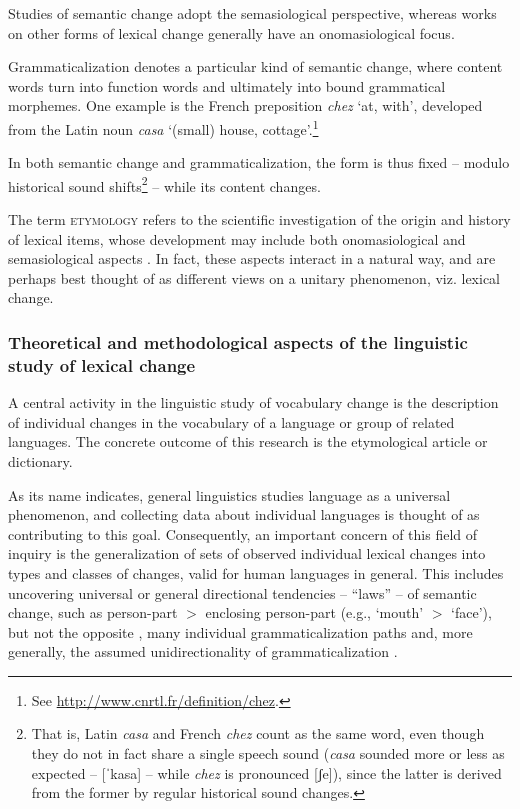 \documentclass[output=paper]{langsci/langscibook}
\begin{document}
\begin{sloppypar}
Studies of semantic change adopt the semasiological perspective, whereas works on other forms of lexical change generally have an onomasiological focus.
\end{sloppypar}

Grammaticalization
\citep{hopper-traugott-1993,heine-kuteva,smith-2011} denotes a
particular kind of semantic change, where content words turn into
function words and ultimately into bound grammatical morphemes. One example is the
French preposition \emph{chez} `at, with', developed from the Latin
noun \emph{casa} `(small) house, cottage'.\footnote{See
  \url{http://www.cnrtl.fr/definition/chez}.}

In both semantic change and grammaticalization, the form is thus fixed
-- modulo historical sound shifts\footnote{That is, Latin \emph{casa}
  and French \emph{chez} count as the same word, even though they do
  not in fact share a single speech sound (\emph{casa} sounded more or
  less as expected -- 
  [ˈkasa] 
-- while \emph{chez} is pronounced 
  [ʃe]), 
  since the
  latter is derived from the former by regular historical sound
  changes.} -- while its content changes.

The term \textsc{etymology} refers to the scientific investigation of the origin and history of
lexical items, whose development may include both onomasiological and
semasiological aspects \citep{malkiel,anttila-1972,mailhammer-2015}. In fact, these
aspects interact in a natural way, and are perhaps best thought of as
different views on a unitary phenomenon, viz. lexical change. 

\subsubsection{Theoretical and methodological aspects of the linguistic study of lexical change} 

A central activity in the linguistic study of vocabulary change is the description of individual
changes in the vocabulary of a language or group of related
languages. The concrete outcome of this research is the etymological
article or dictionary.

As its name indicates, general linguistics studies language as a
universal phenomenon, and collecting data about individual languages
is thought of as contributing to this goal. Consequently, an important
concern of this field of inquiry is the generalization of sets of
observed individual lexical changes into types and classes of changes,
valid for human languages in general. This includes uncovering
universal or general directional tendencies -- ``laws'' -- of semantic
change, such as person-part $>$ enclosing person-part (e.g.,  `mouth' $>$
`face'), but not the opposite \citep{wilkins}, many individual
grammaticalization paths and, more generally, the assumed
unidirectionality of grammaticalization
\citep{heine-kuteva,smith-2011}.
\end{document}

